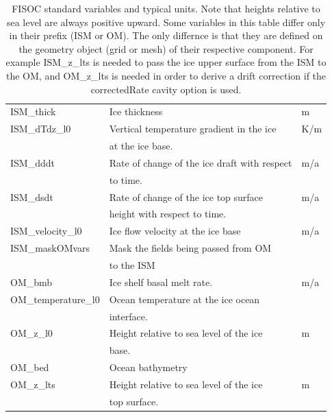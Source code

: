 \documentclass[11pt]{article}
\begin{document}
\begin{table}
\begin{center}
\begin{tabular}{ l|l|l }
      ISM\_thick            & Ice thickness                                & m \\
      ISM\_dTdz\_l0         & Vertical temperature gradient in the ice     & K/m \\
                            & at the ice base.                             &   \\
      ISM\_dddt             & Rate of change of the ice draft with respect & m/a \\
                            & to time.                                     &   \\
      ISM\_dsdt             & Rate of change of the ice top surface        & m/a \\
                            & height with respect to time.                 &   \\
      ISM\_velocity\_l0     & Ice flow velocity at the ice base            & m/a \\
      ISM\_maskOMvars       & Mask the fields being passed from OM         &   \\
                            & to the ISM                                   &   \\
      OM\_bmb               & Ice shelf basal melt rate.                   & m/a \\
      OM\_temperature\_l0   & Ocean temperature at the ice ocean           &   \\
                            & interface.                                   &   \\
      OM\_z\_l0             & Height relative to sea level of the ice      & m \\
                            & base.                                        &   \\
      OM\_bed               & Ocean bathymetry                             &   \\
      OM\_z\_lts            & Height relative to sea level of the ice      & m \\
                            & top surface.                                 &   \\
    \end{tabular}
  \end{center}
  \caption{FISOC standard variables and typical units.  
    Note that heights relative to sea level are always positive upward.
    Some variables in this table differ only in their prefix (ISM or OM).
    The only differnce is that they are defined on the geometry object
    (grid or mesh)  of their respective component.
    For example ISM\_z\_lts is needed to pass the ice upper surface from the ISM
    to the OM, and OM\_z\_lts is needed in order to derive a drift correction if
    the correctedRate cavity option is used.
  }
  \label{tab:vars}
\end{table}
\end{document}
